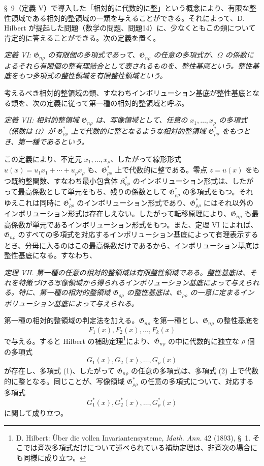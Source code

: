 \documentclass[11pt]{jlreq}
\providecommand{\Kfield}{\mathfrak{K}}
\providecommand{\Gdom}{\mathfrak{G}}
\begin{document}
\S\ 9（定義 V）で導入した「相対的に代数的に整」という概念により、有限な整性領域である相対的整領域の一類を与えることができる。それによって、D. Hilbert が提起した問題（数学の問題、問題14）に、少なくともこの類について肯定的に答えることができる。次の定義を置く。

\emph{定義 VI: $\Gdom_{n\rho}$ の有限個の多項式であって、$\Gdom_{n\rho}$ の任意の多項式が、$\Omega$ の係数によるそれら有限個の整有理結合として表されるものを、整性基底という。整性基底をもつ多項式の整性領域を有限整性領域という。}

考えるべき相対的整領域の類、すなわちインボリューション基底が整性基底となる類を、次の定義に従って第一種の相対的整領域と呼ぶ。

\emph{定義 VII: 相対的整領域 $\Gdom_{n\rho}$ は、写像領域として、任意の $x_1,\ldots,x_\rho$ の多項式（係数は $\Omega$）が $\Gdom^*_{\rho\rho}$ 上で代数的に整となるような相対的整領域 $\Gdom^*_{\rho\rho}$ をもつとき、第一種であるという。}

この定義により、不定元 $x_1,\ldots,x_\rho$、したがって線形形式 $u(x)=u_1x_1+\cdots+u_\rho x_\rho$ も、$\Gdom^*_{\rho\rho}$ 上で代数的に整である。零点 $z=u(x)$ をもつ既約整関数、すなわち最小包含体 $\Kfield^*_{\rho\rho}$ のインボリューション形式は、したがって最高係数として単元をもち、残りの係数として $\Gdom^*_{\rho\rho}$ の多項式をもつ。それゆえこれは同時に $\Gdom^*_{\rho\rho}$ のインボリューション形式であり、$\Gdom^*_{\rho\rho}$ にはそれ以外のインボリューション形式は存在しえない。したがって転移原理により、$\Gdom_{n\rho}$ も最高係数が単元であるインボリューション形式をもつ。また、定理 VI によれば、$\Gdom_{n\rho}$ のすべての多項式を対応するインボリューション基底によって有理表示するとき、分母に入るのはこの最高係数だけであるから、インボリューション基底は整性基底になる。すなわち、

\emph{定理 VII. 第一種の任意の相対的整領域は有限整性領域である。整性基底は、それを特徴づける写像領域から得られるインボリューション基底によって与えられる。特に、第一種の相対的整領域 $\Gdom_{\rho\rho}$ の整性基底は、$\Gdom_{\rho\rho}$ の一意に定まるインボリューション基底によって与えられる。}

第一種の相対的整領域の判定法を加える。$\Gdom_{n\rho}$ を第一種とし、$\Gdom_{n\rho}$ の整性基底を
\begin{equation}
  F_1(x),F_2(x),\ldots,F_k(x)
\tag{1}
\end{equation}
で与える。すると Hilbert の補助定理\footnote{D. Hilbert: Über die vollen Invariantensysteme, \emph{Math. Ann.} 42 (1893), \S\ 1. そこでは斉次多項式だけについて述べられている補助定理は、非斉次の場合にも同様に成り立つ。}により、$\Gdom_{n\rho}$ の中に代数的に独立な $\rho$ 個の多項式
\begin{equation}
  G_1(x),G_2(x),\ldots,G_\rho(x)
\tag{2}
\end{equation}
が存在し、多項式 (1)、したがって $\Gdom_{n\rho}$ の任意の多項式は、多項式 (2) 上で代数的に整となる。同じことが、写像領域 $\Gdom^*_{\rho\rho}$ の任意の多項式について、対応する多項式
\begin{equation}
  G_1^*(x),G_2^*(x),\ldots,G_\rho^*(x)
\tag{3}
\end{equation}
に関して成り立つ。
\end{document}
